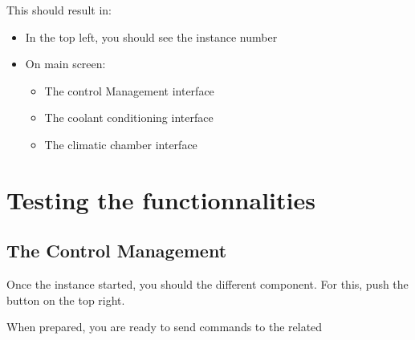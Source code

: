 \documentclass[letterpaper,10pt,english]{jupyterBook}
\begin{document}
\sphinxAtStartPar
This should result in:
\begin{itemize}
\item {} 
\sphinxAtStartPar
In the top left, you should see the instance number

\item {} 
\sphinxAtStartPar
On main screen:
\begin{itemize}
\item {} 
\sphinxAtStartPar
The control Management interface

\item {} 
\sphinxAtStartPar
The coolant conditioning interface

\item {} 
\sphinxAtStartPar
The climatic chamber interface

\end{itemize}

\end{itemize}


\section{Testing the functionnalities}
\label{\detokenize{06_Starting_An_instance:testing-the-functionnalities}}

\subsection{The Control Management}
\label{\detokenize{06_Starting_An_instance:the-control-management}}
\sphinxAtStartPar
Once the instance started, you should  the different component. For this, push the  button on the top right.

\sphinxAtStartPar
When prepared, you are ready to send commands to the related 
\end{document}
